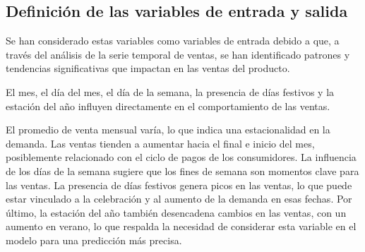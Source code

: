


\subsection{Definición de las variables de entrada y salida}

Se han considerado estas variables como variables de entrada debido a que, a través del análisis de la serie temporal de ventas, se han identificado patrones y tendencias significativas que impactan en las ventas del producto.

\vspace{1\baselineskip}
El mes, el día del mes, el día de la semana, la presencia de días festivos y la estación del año influyen directamente en el comportamiento de las ventas. 

\vspace{1\baselineskip}
El promedio de venta mensual varía, lo que indica una estacionalidad en la demanda. Las ventas tienden a aumentar hacia el final e inicio del mes, posiblemente relacionado con el ciclo de pagos de los consumidores. La influencia de los días de la semana sugiere que los fines de semana son momentos clave para las ventas. La presencia de días festivos genera picos en las ventas, lo que puede estar vinculado a la celebración y al aumento de la
demanda en esas fechas. Por último, la estación del año también desencadena cambios en las ventas, con un aumento en verano, lo que respalda la necesidad de considerar esta variable en el modelo para una predicción más precisa.

